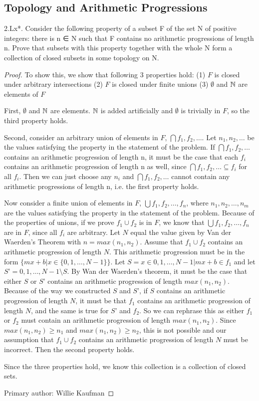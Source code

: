 \subsection{Topology and Arithmetic Progressions}

\begin{majorEx}
2.Lx*. Consider the following property of a subset F of the set N of positive
integers: there is n ∈ N such that F contains no arithmetic progressions of
length n. Prove that subsets with this property together with the whole N
form a collection of closed subsets in some topology on N.
\end{majorEx}
\begin{proof}
To show this, we show that following 3 properties hold:
(1) $F$ is closed under arbitrary intersections
(2) $F$ is closed under finite unions
(3) $\emptyset$ and $\mathbb{N}$ are elements of $F$

First, $\emptyset$ and $\mathbb{N}$ are elements. $\mathbb{N}$ is added artificially and $\emptyset$ is trivially in $F$, so the third property holds.

Second, consider an arbitrary union of elements in $F$, $\bigcap f_1, f_2, …$. Let $n_1, n_2, …$ be the values satisfying the property in the statement of the problem. If $\bigcap f_1, f_2, …$ contains an arithmetic progression of length n, it must be the case that each $f_i$ contains an arithmetic progression of length n as well, since $\bigcap f_1, f_2, … \subseteq f_i$ for all $f_i$. Then we can just choose any $n_i$ and $\bigcap f_1, f_2, …$ cannot contain any arithmetic progressions of length n, i.e. the first property holds.

Now consider a finite union of elements in $F$, $\bigcup f_1, f_2, …, f_n$, where $n_1, n_2, …, n_m$ are the values satisfying the property in the statement of the problem. Because of the properties of unions, if we prove $f_1 \cup f_2$ is in $F$, we know that $\bigcup f_1, f_2, …, f_n$ are in $F$, since all $f_i$ are arbitrary. Let $N$ equal the value given by Van der Waerden’s Theorem with $n = max(n_1, n_2)$. Assume that $f_1 \cup f_2$ contains an arithmetic progression of length $N$. This arithmetic progression must be in the form $\{mx + b | x \in \{0, 1, …, N -1\}\}$. Let $S = {x \in {0, 1, …, N -1} | mx + b \in f_1}$ and let $S’ = {0, 1, …, N - 1} \setminus S$. By Wan der Waerden’s theorem, it must be the case that either $S$ or $S’$ contains an arithmetic progression of length $max(n_1, n_2)$. Because of the way we constructed $S$ and $S’$, if $S$ contains an arithmetic progression of length $N$, it must be that $f_1$ contains an arithmetic progression of length $N$, and the same is true for $S’$ and $f_2$. So we can rephrase this as either $f_1$ or $f_2$ must contain an arithmetic progression of length $max(n_1, n_2)$. Since $max(n_1, n_2) \geq n_1$ and $max(n_1, n_2) \geq n_2$, this is not possible and our assumption that $f_1 \cup f_2$ contains an arithmetic progression of length $N$ must be incorrect. Then the second property holds.

Since the three properties hold, we know this collection is a collection of closed sets.

Primary author: Willie Kaufman
\end{proof}


